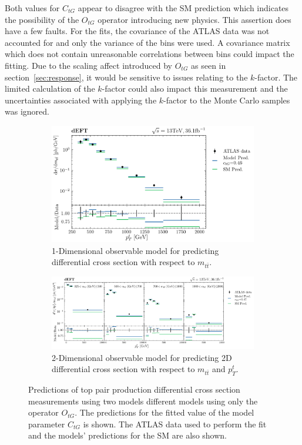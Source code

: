 \documentclass[a4paper,11pt]{article}
\begin{document}
Both values for $C_{tG}$ appear to disagree with the SM prediction which indicates the possibility of the $O_{tG}$ operator introducing new physics.
This assertion does have a few faults.
For the fits, the covariance of the ATLAS data was not accounted for and only the variance of the bins were used.
A covariance matrix which does not contain unreasonable correlations between bins could impact the fitting.
Due to the scaling affect introduced by $O_{tG}$ as seen in section~\ref{sec:response}, it would be sensitive to issues relating to the $k$-factor.
The limited calculation of the $k$-factor could also impact this measurement and the uncertainties associated with applying the $k$-factor to the Monte Carlo samples was ignored.

\begin{figure}[H]
    \centering
    \begin{subfigure}[b]{0.8\textwidth}
        \centering
        \includegraphics[width=\textwidth]{plots/ATLAS_model_result_1D_1OP.png}
        \caption{1-Dimensional observable model for predicting differential cross section with respect to $m_{t\bar{t}}$.}
    \end{subfigure}
    \par\bigskip
    \begin{subfigure}[b]{\textwidth}
        \centering
        \includegraphics[width=\textwidth]{plots/ATLAS_model_result_2D_1OP.png}
        \caption{2-Dimensional observable model for predicting 2D differential cross section with respect to $m_{t\bar{t}}$ and $p_{T}^{t}$.}
    \end{subfigure}
    \caption{Predictions of top pair production differential cross section measurements using two models different models using only the operator $O_{tG}$. The predictions for the fitted value of the model parameter $C_{tG}$ is shown. The ATLAS data used to perform the fit and the models' predictions for the SM are also shown.}
    \label{fig:model_result_1OP}
\end{figure}
\end{document}
